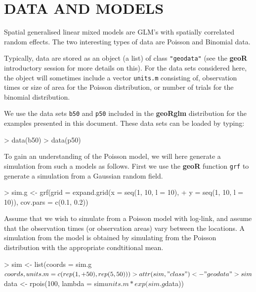 \documentclass[12pt,a4paper]{article}
\newcommand{\strong}[1]{{\textbf{ #1}}}
\let\pkg=\strong
\newcommand{\code}[1]{\texttt{\small #1}}
\let\command=\code
\begin{document}
\section{DATA AND MODELS}

Spatial generalised linear mixed models are GLM's with spatially
correlated random effects. The two interesting types
of data are Poisson and Binomial data. 

Typically, data are stored as an object (a list) of class \code{"geodata"} (see the \pkg{geoR} introductory session 
for more details on this). For the data sets considered here, the object will sometimes include a vector \code{units.m} consisting 
of, observation times or size of area for the Poisson distribution, or
number of trials for the binomial distribution.

We use the data sets \code{b50} and \code{p50} included in the \pkg{geoRglm} distribution for 
the examples presented in this document. These data sets can be loaded by typing:
\begin{Schunk}
\begin{Sinput}
> data(b50)
> data(p50)
\end{Sinput}
\end{Schunk}

To gain an understanding of the Poisson model, we will here generate a
simulation from such a models as follows.
First we use the \pkg{geoR} function \command{grf} to generate a
simulation from a Gaussian random field. 
\begin{Schunk}
\begin{Sinput}
> sim.g <- grf(grid = expand.grid(x = seq(1, 10, l = 10), 
+     y = seq(1, 10, l = 10)), cov.pars = c(0.1, 0.2))
\end{Sinput}
\end{Schunk}
Assume that we wish to
simulate from a Poisson model with log-link, and assume that the
observation times (or observation areas) vary between the locations. 
A simulation from the model is obtained by simulating from the Poisson
distribution with the appropriate condtitional mean.
\begin{Schunk}
\begin{Sinput}
> sim <- list(coords = sim.g$coords, units.m = c(rep(1, 
+     50), rep(5, 50)))
> attr(sim, "class") <- "geodata"
> sim$data <- rpois(100, lambda = sim$units.m * exp(sim.g$data))
\end{Sinput}
\end{Schunk}
\end{document}
